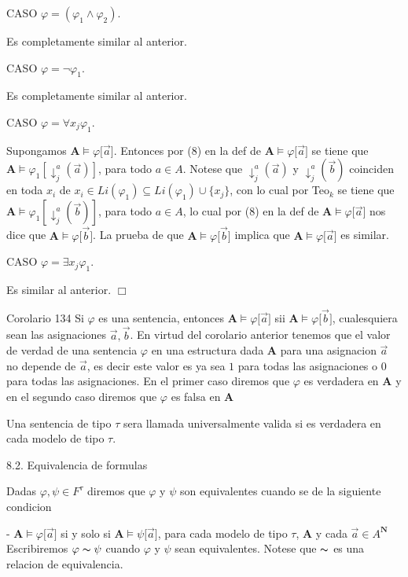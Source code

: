 CASO \(\varphi =(\varphi _{1}\wedge \varphi _{2})\).

Es completamente similar al anterior.

CASO \(\varphi =\lnot \varphi _{1}.\)

Es completamente similar al anterior.

CASO \(\varphi =\forall x_{j}\varphi _{1}.\)

Supongamos \(\mathbf{A}\models \varphi \lbrack \vec{a}]\). Entonces por (8) en la def de \(\mathbf{A}\models \varphi \lbrack \vec{a}]\) se tiene que \(\mathbf{A}\models \varphi _{1}[\downarrow _{j}^{a}(\vec{a})]\), para todo \(a\in A\). Notese que \(\downarrow _{j}^{a}(\vec{a})\) y \(\downarrow _{j}^{a}(\vec{b})\) coinciden en toda \(x_{i}\) de \(x_{i}\in Li(\varphi _{1})\subseteq Li(\varphi _{1})\cup \{x_{j}\}\), con lo cual por Teo\(_{k}\) se tiene que \(\mathbf{A}\models \varphi _{1}[\downarrow _{j}^{a}(\vec{b})]\), para todo \(a\in A\), lo cual por (8) en la def de \(\mathbf{A}\models \varphi \lbrack \vec{a}]\) nos dice que \(\mathbf{A}\models \varphi \lbrack \vec{b}]\). La prueba de que \(\mathbf{A}\models \varphi \lbrack \vec{b}]\) implica que \( \mathbf{A}\models \varphi \lbrack \vec{a}]\) es similar.

CASO \(\varphi =\exists x_{j}\varphi _{1}\).

Es similar al anterior. \(\Box\)

Corolario 134 Si \(\varphi \) es una sentencia, entonces \(\mathbf{A}\models \varphi \lbrack \vec{a}]\) sii \(\mathbf{A}\models \varphi \lbrack \vec{b}]\), cualesquiera sean las asignaciones \(\vec{a},\vec{b}\).
En virtud del corolario anterior tenemos que el valor de verdad de una sentencia \(\varphi \) en una estructura dada \(\mathbf{A}\) para una asignacion \(\vec{a}\) no depende de \(\vec{a}\), es decir este valor es ya sea \(1\) para todas las asignaciones o \(0\) para todas las asignaciones. En el primer caso diremos que \(\varphi \) es verdadera en \(\mathbf{A}\) y en el segundo caso diremos que \(\varphi \) es falsa en \(\mathbf{A}\)

Una sentencia de tipo \(\tau \) sera llamada universalmente valida si es verdadera en cada modelo de tipo \(\tau \).

8.2. Equivalencia de formulas

Dadas \(\varphi ,\psi \in F^{\tau }\) diremos que \(\varphi \) y \(\psi \) son equivalentes cuando se de la siguiente condicion

- \(\mathbf{A}\models \varphi \lbrack \vec{a}]\) si y solo si \(\mathbf{A }\models \psi \lbrack \vec{a}]\), para cada modelo de tipo \(\tau \), \(\mathbf{A }\) y cada \(\vec{a}\in A^{\mathbf{N}}\)
Escribiremos \(\varphi \thicksim \psi \) cuando \(\varphi \) y \(\psi \) sean equivalentes. Notese que \(\thicksim \) es una relacion de equivalencia.


